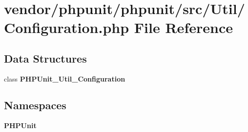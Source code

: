 \section{vendor/phpunit/phpunit/src/\+Util/\+Configuration.php File Reference}
\label{phpunit_2phpunit_2src_2_util_2_configuration_8php}
\subsection*{Data Structures}
\begin{DoxyCompactItemize}
\item 
class {\bf P\+H\+P\+Unit\+\_\+\+Util\+\_\+\+Configuration}
\end{DoxyCompactItemize}
\subsection*{Namespaces}
\begin{DoxyCompactItemize}
\item 
 {\bf P\+H\+P\+Unit}
\end{DoxyCompactItemize}

